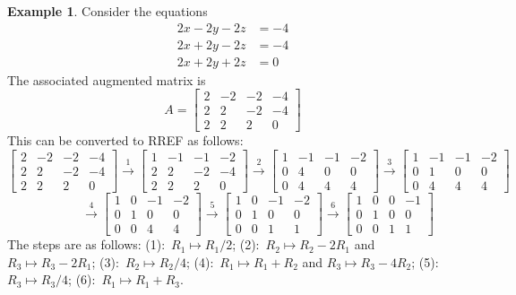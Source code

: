 \documentclass[a4paper]{book}
\newcommand{\xra}       {\xrightarrow}
\renewcommand{\:}{\colon}
\theoremstyle{definition}
\newtheorem{example}[theorem]{Example}
\begin{document}
\begin{example}
 Consider the equations
 \begin{align*}
  2x-2y-2z &= -4 \\
  2x+2y-2z &= -4 \\
  2x+2y+2z &= 0
 \end{align*}
 The associated augmented matrix is 
 \[ A = \left[\begin{array}{ccc|c}
         2&-2&-2&-4 \\
         2& 2&-2&-4 \\ 
         2& 2& 2& 0
        \end{array}\right]          
 \]
 This can be converted to RREF as follows:
 {\small \[
  \left[\begin{array}{ccc|c}   
   2&-2&-2&-4 \\       
   2& 2&-2&-4 \\       
   2& 2& 2& 0
  \end{array}\right] \xra{1}
  \left[\begin{array}{ccc|c}   
   1&-1&-1&-2 \\       
   2& 2&-2&-4 \\       
   2& 2& 2& 0
  \end{array}\right] \xra{2}
  \left[\begin{array}{ccc|c}   
   1&-1&-1&-2 \\       
   0& 4& 0& 0 \\       
   0& 4& 4& 4
  \end{array}\right] \xra{3}
  \left[\begin{array}{ccc|c}   
   1&-1&-1&-2 \\       
   0& 1& 0& 0 \\       
   0& 4& 4& 4
  \end{array}\right] 
 \]
 \[
  \hspace{4em}\xra{4}
  \left[\begin{array}{ccc|c}   
   1& 0&-1&-2 \\       
   0& 1& 0& 0 \\       
   0& 0& 4& 4
  \end{array}\right] \xra{5}
  \left[\begin{array}{ccc|c}   
   1& 0&-1&-2 \\       
   0& 1& 0& 0 \\       
   0& 0& 1& 1
  \end{array}\right] \xra{6}
  \left[\begin{array}{ccc|c}   
   1& 0& 0&-1 \\       
   0& 1& 0& 0 \\       
   0& 0& 1& 1
  \end{array}\right]
 \]}
 The steps are as follows: (1):~$R_1\mapsto R_1/2$;
 (2):~$R_2\mapsto R_2-2R_1$ and $R_3\mapsto R_3-2R_1$; 
 (3):~$R_2\mapsto R_2/4$; (4):~$R_1\mapsto R_1+R_2$ and
 $R_3\mapsto R_3-4R_2$; (5):~$R_3\mapsto R_3/4$; 
 (6):~$R_1\mapsto R_1+R_3$.


\end{example}
\end{document}
